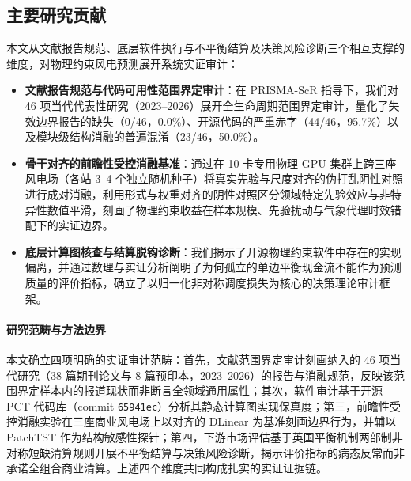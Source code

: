 \subsection{主要研究贡献}
本文从文献报告规范、底层软件执行与不平衡结算及决策风险诊断三个相互支撑的维度，对物理约束风电预测展开系统实证审计：
\begin{itemize}[leftmargin=*]
\item \textbf{文献报告规范与代码可用性范围界定审计}：在 PRISMA-ScR 指导下，我们对 46 项当代代表性研究（2023--2026）展开全生命周期范围界定审计，量化了失效边界报告的缺失（0/46，0.0\%）、开源代码的严重赤字（44/46，95.7\%）以及模块级结构消融的普遍混淆（23/46，50.0\%）。
\item \textbf{骨干对齐的前瞻性受控消融基准}：通过在 10 卡专用物理 GPU 集群上跨三座风电场（各站 3--4 个独立随机种子）将真实先验与尺度对齐的伪打乱阴性对照进行成对消融，利用形式与权重对齐的阴性对照区分领域特定先验效应与非特异性数值平滑，刻画了物理约束收益在样本规模、先验扰动与气象代理时效错配下的实证边界。
\item \textbf{底层计算图核查与结算脱钩诊断}：我们揭示了开源物理约束软件中存在的实现偏离，并通过数理与实证分析阐明了为何孤立的单边平衡现金流不能作为预测质量的评价指标，确立了以归一化非对称调度损失为核心的决策理论审计框架。
\end{itemize}

\paragraph{研究范畴与方法边界}
本文确立四项明确的实证审计范畴：首先，文献范围界定审计刻画纳入的 46 项当代研究（38 篇期刊论文与 8 篇预印本，2023--2026）的报告与消融规范，反映该范围界定样本内的报道现状而非断言全领域通用属性；其次，软件审计基于开源 PCT 代码库（commit \texttt{65941ec}）分析其静态计算图实现保真度；第三，前瞻性受控消融实验在三座商业风电场上以对齐的 DLinear 为基准刻画边界行为，并辅以 PatchTST 作为结构敏感性探针；第四，下游市场评估基于英国平衡机制两部制非对称短缺清算规则开展不平衡结算与决策风险诊断，揭示评价指标的病态反常而非承诺全组合商业清算。上述四个维度共同构成扎实的实证证据链。
